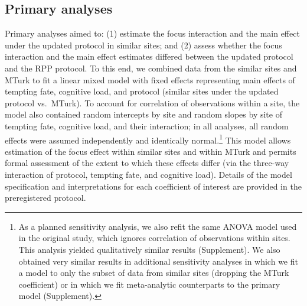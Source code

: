 \documentclass[english,floatsintext,man]{apa6}
\theoremstyle{definition}
\theoremstyle{definition}
\theoremstyle{definition}
\theoremstyle{remark}
\begin{document}
\subsection{Primary analyses}\label{primary-analyses}

Primary analyses aimed to: (1) estimate the focus interaction and the
main effect under the updated protocol in similar sites; and (2) assess
whether the focus interaction and the main effect estimates differed
between the updated protocol and the RPP protocol. To this end, we
combined data from the similar sites and MTurk to fit a linear mixed
model with fixed effects representing main effects of tempting fate,
cognitive load, and protocol (similar sites under the updated protocol
vs.~MTurk). To account for correlation of observations within a site,
the model also contained random intercepts by site and random slopes by
site of tempting fate, cognitive load, and their interaction; in all
analyses, all random effects were assumed independently and identically
normal.\footnote{As a planned sensitivity analysis, we also refit the
  same ANOVA model used in the original study, which ignores correlation
  of observations within sites. This analysis yielded qualitatively
  similar results (Supplement). We also obtained very similar results in
  additional sensitivity analyses in which we fit a model to only the
  subset of data from similar sites (dropping the MTurk coefficient) or
  in which we fit meta-analytic counterparts to the primary model
  (Supplement).} This model allows estimation of the focus effect within
similar sites and within MTurk and permits formal assessment of the
extent to which these effects differ (via the three-way interaction of
protocol, tempting fate, and cognitive load). Details of the model
specification and interpretations for each coefficient of interest are
provided in the preregistered protocol.
\end{document}
